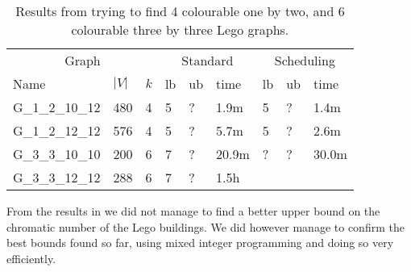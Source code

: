 \begin{table}[H]\label{table3}
\centering
\begin{tabular}{|lll|lll|lll|}
\hline
\multicolumn{3}{|c|}{Graph}&\multicolumn{3}{c|}{Standard}&\multicolumn{3}{c|}{Scheduling}\\
Name&$|V|$&$k$&lb&ub&time&lb&ub&time\\
\hline
G\_1\_2\_10\_12&480&4&5&?&1.9m&5&?&1.4m\\
\hline  
G\_1\_2\_12\_12&576&4&5&?&5.7m&5&?&2.6m\\
\hline
G\_3\_3\_10\_10&200&6&7&?&20.9m&?&?&30.0m\\
\hline
G\_3\_3\_12\_12&288&6&7&?&1.5h&\multicolumn{3}{c}{}\\
\cline{1-6}
\end{tabular}
\caption{Results from trying to find 4 colourable one by two, and 6 colourable three by three Lego graphs.}
\end{table}
\noindent From the results in  we did not manage to find a better upper bound on the chromatic number of the Lego buildings. We did however manage to confirm the best bounds found so far, using mixed integer programming and doing so very efficiently.